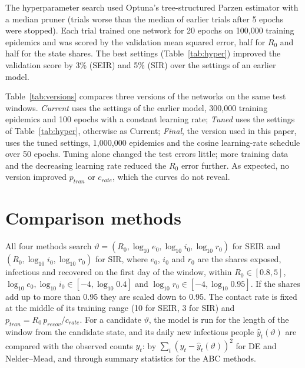 \documentclass[12pt]{article}
\begin{document}
The hyperparameter search used Optuna's tree-structured Parzen estimator with a median pruner (trials worse
than the median of earlier trials after 5 epochs were stopped). Each trial trained one network for 20 epochs
on 100,000 training epidemics and was scored by the validation mean squared error, half for $R_0$ and half
for the state shares. The best settings (Table~\ref{tab:hyper}) improved the validation score by 3\% (SEIR)
and 5\% (SIR) over the settings of an earlier model.

Table~\ref{tab:versions} compares three versions of the networks on the same test windows. \emph{Current}
uses the settings of the earlier model, 300,000 training epidemics and 100 epochs with a constant learning
rate; \emph{Tuned} uses the settings of Table~\ref{tab:hyper}, otherwise as Current; \emph{Final}, the
version used in this paper, uses the tuned settings, 1,000,000 epidemics and the cosine learning-rate
schedule over 50 epochs. Tuning alone changed the test errors little; more training data and the
decreasing learning rate reduced the $R_0$ error further. As expected, no version improved $p_{tran}$ or
$c_{rate}$, which the curves do not reveal.

\begin{table}[htbp]
\centering
\caption{Mean absolute error of $R_0$, $p_{tran}$ and $c_{rate}$ of three versions of the networks (5
networks each) on the same test windows: 61-day windows from the beginning of the test epidemics, and all
test windows (lengths 30--365 days at the beginning, middle and end).}
\label{tab:versions}
\small

\end{table}

\section{Comparison methods}\label{app:baselines}

All four methods search $\vartheta = (R_0, \log_{10} e_0, \log_{10} i_0, \log_{10} r_0)$ for SEIR and
$(R_0, \log_{10} i_0, \log_{10} r_0)$ for SIR, where $e_0$, $i_0$ and $r_0$ are the shares exposed,
infectious and recovered on the first day of the window, within $R_0\in[0.8, 5]$,
$\log_{10} e_0, \log_{10} i_0 \in [-4, \log_{10} 0.4]$ and $\log_{10} r_0 \in [-4, \log_{10} 0.95]$. If the
shares add up to more than 0.95 they are scaled down to 0.95. The contact rate is fixed at the middle of its
training range (10 for SEIR, 3 for SIR) and $p_{tran} = R_0\, p_{recov}/c_{rate}$. For a candidate
$\vartheta$, the model is run for the length of the window from the candidate state, and its daily new
infectious people $\hat y_t(\vartheta)$ are compared with the observed counts $y_t$: by
$\sum_t (y_t - \hat y_t(\vartheta))^2$ for DE and Nelder--Mead, and through summary statistics for the ABC
methods.
\end{document}
